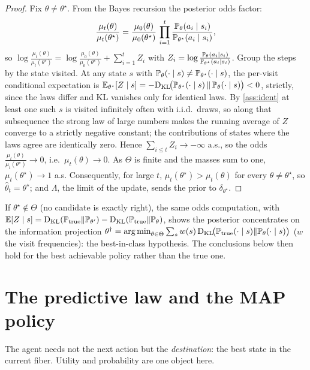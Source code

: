 \documentclass[../uxoxo-main]{subfiles}
\begin{document}
\begin{proof}
Fix $\theta\ne\theta^\star$. From the Bayes recursion the posterior odds factor:
\[
  \frac{\mu_t(\theta)}{\mu_t(\theta^\star)}
  =\frac{\mu_0(\theta)}{\mu_0(\theta^\star)}\,
   \prod_{i=1}^{t}\frac{\mathbb{P}_\theta(a_i\mid s_i)}{\mathbb{P}_{\theta^\star}(a_i\mid s_i)},
\]
so $\log\frac{\mu_t(\theta)}{\mu_t(\theta^\star)}
=\log\frac{\mu_0(\theta)}{\mu_0(\theta^\star)}+\sum_{i=1}^{t}Z_i$ with
$Z_i=\log\frac{\mathbb{P}_\theta(a_i\mid s_i)}{\mathbb{P}_{\theta^\star}(a_i\mid s_i)}$.
Group the steps by the state visited. At any state $s$ with
$\mathbb{P}_\theta(\cdot\mid s)\ne\mathbb{P}_{\theta^\star}(\cdot\mid s)$, the per-visit
conditional expectation is
$\mathbb{E}_{\theta^\star}[Z\mid s]=-\mathrm{D}_{\mathrm{KL}}\!\bigl(\mathbb{P}_{\theta^\star}(\cdot\mid s)\,\Vert\,
\mathbb{P}_\theta(\cdot\mid s)\bigr)<0$, strictly, since the laws differ and KL
vanishes only for identical laws. By \cref{ass:ident} at least one such $s$ is
visited infinitely often with i.i.d.\ draws, so along that subsequence the strong
law of large numbers makes the running average of $Z$ converge to a strictly
negative constant; the contributions of states where the laws agree are
identically zero. Hence $\sum_{i\le t}Z_i\to-\infty$ a.s., so the odds
$\frac{\mu_t(\theta)}{\mu_t(\theta^\star)}\to0$, i.e.\ $\mu_t(\theta)\to0$.
As $\Theta$ is finite and the masses sum to one, $\mu_t(\theta^\star)\to1$ a.s.
Consequently, for large $t$, $\mu_t(\theta^\star)>\mu_t(\theta)$ for every
$\theta\ne\theta^\star$, so $\hat\theta_t=\theta^\star$; and $\Lambda$, the limit
of the update, sends the prior to $\delta_{\theta^\star}$.
\end{proof}

\begin{remark}[Misspecification]\label{rem:misspec}
If $\theta^\star\notin\Theta$ (no candidate is exactly right), the same odds
computation, with $\mathbb{E}[Z\mid s]=\mathrm{D}_{\mathrm{KL}}(\mathbb{P}_{\mathrm{true}}\Vert\mathbb{P}_{\theta'})-
\mathrm{D}_{\mathrm{KL}}(\mathbb{P}_{\mathrm{true}}\Vert\mathbb{P}_\theta)$, shows the posterior concentrates on
the information projection
$\theta^\dagger=\operatorname*{arg\,min}_{\theta\in\Theta}\sum_{s}w(s)\,
\mathrm{D}_{\mathrm{KL}}\!\bigl(\mathbb{P}_{\mathrm{true}}(\cdot\mid s)\Vert\mathbb{P}_\theta(\cdot\mid s)\bigr)$
($w$ the visit frequencies): the best-in-class hypothesis. The conclusions below
then hold for the best achievable policy rather than the true one.
\end{remark}

\section{The predictive law and the MAP policy}\label{sec:map}
The agent needs not the next action but the \emph{destination}: the best state in
the current fiber. Utility and probability are one object here.
\end{document}
